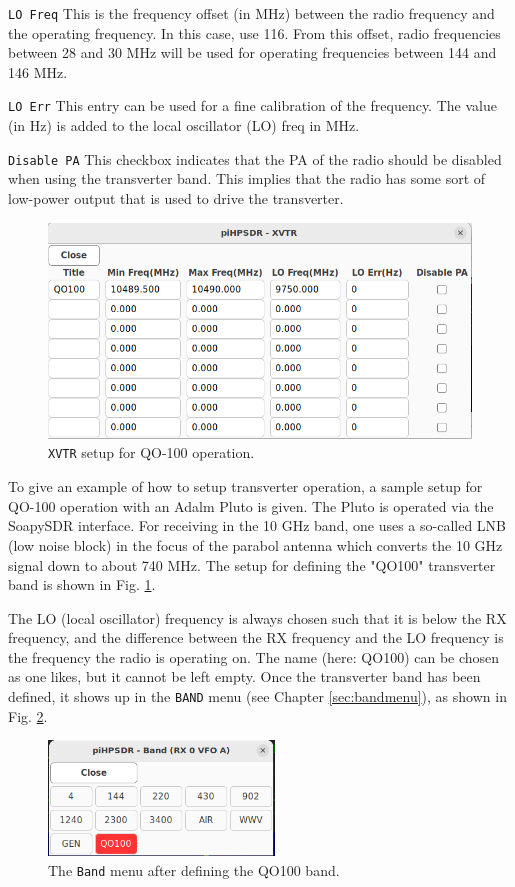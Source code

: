 \documentclass[12pt]{book}
\def\rett#1{\texttt{\color{red}#1}}
\def\bltt#1{\texttt{\color{blue}#1}}
\begin{document}
\rett{LO Freq} This is the frequency offset (in MHz) between the radio frequency and
the operating frequency. In this case, use 116. From this offset, radio frequencies
between 28 and 30 MHz will be used for operating frequencies between 144 and 146 MHz.

\rett{LO Err} This entry can be used for a fine calibration of the frequency. The value
(in Hz) is added to the local oscillator (LO) freq in MHz.

\rett{Disable PA} This checkbox indicates that the PA of the radio should be disabled
when using the transverter band. This implies that the radio has some sort of
low-power output that is used to drive the transverter.

\begin{figure}[h!]
\center
\includegraphics[width=12cm]{QO100-XVTR.png}
\caption{\bltt{XVTR} setup for QO-100 operation.}
\label{fig:QO100-XVTR}
\end{figure}

To give an example of how to setup transverter operation, a sample setup for QO-100 operation
with an Adalm Pluto is given.
The Pluto is
operated via the SoapySDR interface. For receiving in the 10 GHz band, one uses a so-called
LNB (low noise block) in the focus of the parabol antenna which converts the 10 GHz signal down
to about 740 MHz. The setup for defining the "QO100" transverter band is shown in Fig.
\ref{fig:QO100-XVTR}.

The LO (local oscillator) frequency is always chosen such that it is below the RX frequency,
and the difference between the RX frequency and the LO frequency is the frequency the radio
is operating on. The name (here: QO100) can be chosen as one likes, but it cannot be left
empty. Once the transverter band has been defined, it shows up in the \bltt{BAND} menu
(see Chapter \ref{sec:bandmenu}), as shown in Fig. \ref{fig:QO100-BandMenu}.

\begin{figure}[ht]
\center
\includegraphics[width=6cm]{QO100-BandMenu.png}
\caption{The \bltt{Band} menu after defining the QO100 band.}
\label{fig:QO100-BandMenu}
\end{figure}
\end{document}
